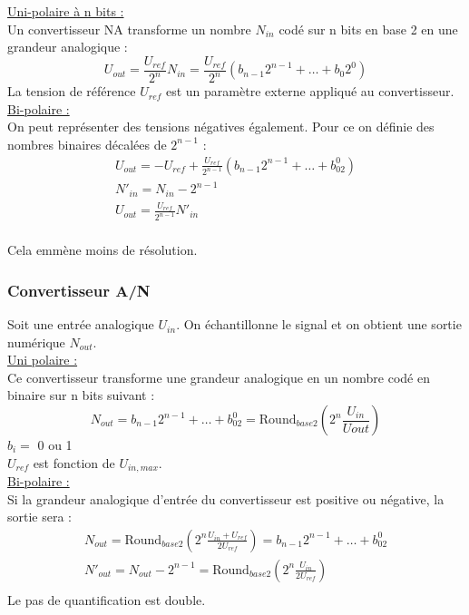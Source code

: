 \documentclass[../main.tex]{subfiles}
\begin{document}
\quad \underline{Uni-polaire à n bits :}\\
Un convertisseur NA transforme un nombre $N_{in}$ codé sur n bits en base 2 en une grandeur analogique : \begin{equation}
    U_{out} = \frac{U_{ref}}{2^n}N_{in} = \frac{U_{ref}}{2^n} (b_{n-1}2^{n-1} + \dots + b_0 2^0)
\end{equation}
La tension de référence $U_{ref}$ est un paramètre externe appliqué au convertisseur.\\

\quad \underline{Bi-polaire :}\\
On peut représenter des tensions négatives également. Pour ce on définie des nombres binaires décalées de $2^{n-1}$ : \begin{equation}
    \begin{gathered}
        U_{out} = -U_{ref} + \frac{U_{ref}}{2^{n-1}}(b_{n-1} 2^{n-1} + \dots + b_02^0)\\
        N'_{in} = N_{in} - 2^{n-1}\\
        U_{out} = \frac{U_{ref}}{2^{n-1}}N'_{in}\\
    \end{gathered}
\end{equation}

\warning Cela emmène moins de résolution.\\

\subsubsection{Convertisseur A/N}
Soit une entrée analogique $U_{in}$. On échantillonne le signal et on obtient une sortie numérique $N_{out}$.\\

\quad \underline{Uni polaire :}\\
Ce convertisseur transforme une grandeur analogique en un nombre codé en binaire sur n bits suivant : \begin{equation}
    N_{out} = b_{n-1}2^{n-1} + \dots + b_02^0 = \text{Round}_{base2} (2^n \frac{U_{in}}{U{out}})
\end{equation}
$b_i =$ 0 ou 1\\
\warning $U_{ref}$ est fonction de $U_{in,max}$.\\

\quad \underline{Bi-polaire :}\\
Si la grandeur analogique d'entrée du convertisseur est positive ou négative, la sortie sera :\begin{equation}
    \begin{gathered}
        N_{out} = \text{Round}_{base2} ( 2^n \frac{U_{in}+U_{ref}}{2U_{ref}}) = b_{n-1}2^{n-1} + \dots + b_02^0\\
        N'_{out} = N_{out}-2^{n-1} = \text{Round}_{base2} (2^n \frac{U_{in}}{2U_{ref}})\\
    \end{gathered}
\end{equation}
\warning Le pas de quantification est double.\\
\end{document}

